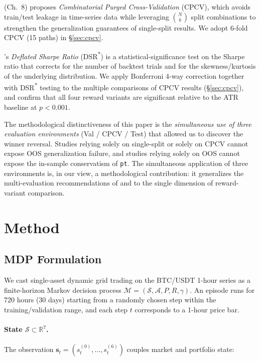 \documentclass[11pt, a4paper]{article}
\begin{document}
\citet{lopezdeprado2018advances} (Ch.\ 8) proposes \emph{Combinatorial Purged
Cross-Validation} (CPCV), which avoids train/test leakage in time-series data
while leveraging $\binom{N}{k}$ split combinations to strengthen the
generalization guarantees of single-split results. We adopt 6-fold CPCV
(15 paths) in \S\ref{sec:cpcv}.

\citet{lopezdeprado2014dsr}'s \emph{Deflated Sharpe Ratio}
(DSR\textsuperscript{*}) is a statistical-significance test on the Sharpe
ratio that corrects for the number of backtest trials and for the skewness/kurtosis
of the underlying distribution. We apply Bonferroni 4-way correction together
with DSR\textsuperscript{*} testing to the multiple comparisons of CPCV
results (\S\ref{sec:cpcv}), and confirm that all four reward variants are
significant relative to the ATR baseline at $p<0.001$.

The methodological distinctiveness of this paper is the \emph{simultaneous use
of three evaluation environments} (Val / CPCV / Test) that allowed us to
discover the winner reversal. Studies relying solely on single-split or solely
on CPCV cannot expose OOS generalization failure, and studies relying solely
on OOS cannot expose the in-sample conservatism of \texttt{pt}. The
simultaneous application of three environments is, in our view, a methodological
contribution: it generalizes the multi-evaluation recommendations of
\citet{henderson2018rlreproducibility} and \citet{gort2022backtest} to the
single dimension of reward-variant comparison.

\section{Method}
\label{sec:method}

\subsection{MDP Formulation}
\label{sec:mdp}

We cast single-asset dynamic grid trading on the BTC/USDT 1-hour series as a
finite-horizon Markov decision process $\mathcal{M} = (\mathcal{S},
\mathcal{A}, P, R, \gamma)$. An episode runs for 720 hours (30 days) starting
from a randomly chosen step within the training/validation range, and each
step $t$ corresponds to a 1-hour price bar.

\paragraph{State $\mathcal{S} \subset \mathbb{R}^7$.}
The observation $\mathbf{s}_t = (s_t^{(0)}, \ldots, s_t^{(6)})$ couples market
and portfolio state:
\end{document}
